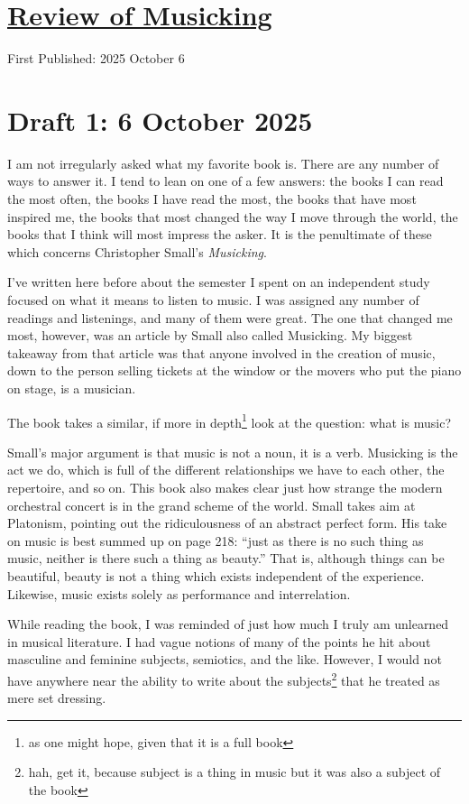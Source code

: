 \documentclass[12pt]{article}
\newcommand{\say}[1]{``#1''}
\renewcommand{\,}{\textsuperscript{,}}
\begin{document}
  
\doublespacing  
\section{\href{book-review-musicking.html}{Review of Musicking}}  
First Published: 2025 October 6

\section{Draft 1: 6 October 2025}

I am not irregularly asked what my favorite book is.  
There are any number of ways to answer it.  
I tend to lean on one of a few answers: the books I can read the most often, the books I have read the most, the books that have most inspired me, the books that most changed the way I move through the world, the books that I think will most impress the asker.  
It is the penultimate of these which concerns Christopher Small's \textit{Musicking}.

I've written here before about the semester I spent on an independent study focused on what it means to listen to music.  
I was assigned any number of readings and listenings, and many of them were great.  
The one that changed me most, however, was an article by Small also called Musicking.  
My biggest takeaway from that article was that anyone involved in the creation of music, down to the person selling tickets at the window or the movers who put the piano on stage, is a musician.

The book takes a similar, if more in depth\footnote{as one might hope, given that it is a full book} look at the question: what is music?

Small's major argument is that music is not a noun, it is a verb.  
Musicking is the act we do, which is full of the different relationships we have to each other, the repertoire, and so on.  
This book also makes clear just how strange the modern orchestral concert is in the grand scheme of the world.  
Small takes aim at Platonism, pointing out the ridiculousness of an abstract perfect form.  
His take on music is best summed up on page 218: \say{just as there is no such thing as music, neither is there such a thing as beauty.}  
That is, although things can be beautiful, beauty is not a thing which exists independent of the experience.  
Likewise, music exists solely as performance and interrelation.

While reading the book, I was reminded of just how much I truly am unlearned in musical literature.  
I had vague notions of many of the points he hit about masculine and feminine subjects, semiotics, and the like.  
However, I would not have anywhere near the ability to write about the subjects\footnote{hah, get it, because subject is a thing in music but it was also a subject of the book} that he treated as mere set dressing.
\end{document}
